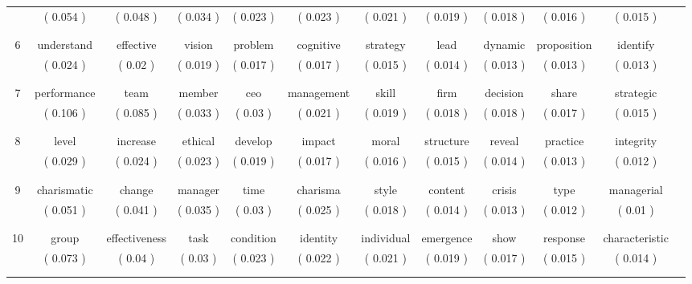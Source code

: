 \documentclass[english]{article}
\begin{document}
\begin{table}
{\begin{threeparttable}
\begin{tabular}{cccccccccccc}
            & ( 0.054 )        & ( 0.048 )     & ( 0.034 )  & ( 0.023 ) & ( 0.023 )  & ( 0.021 )  & ( 0.019 )   & ( 0.018 )   & ( 0.016 )   & ( 0.015 )      \\  \\ [-1.8ex] \\ [-1.8ex]
	6   & understand       & effective     & vision     & problem   & cognitive  & strategy   & lead        & dynamic     & proposition & identify       \\
            & ( 0.024 )        & ( 0.02 )      & ( 0.019 )  & ( 0.017 ) & ( 0.017 )  & ( 0.015 )  & ( 0.014 )   & ( 0.013 )   & ( 0.013 )   & ( 0.013 )      \\  \\ [-1.8ex] \\ [-1.8ex]
	7   & performance      & team          & member     & ceo       & management & skill      & firm        & decision    & share       & strategic      \\
            & ( 0.106 )        & ( 0.085 )     & ( 0.033 )  & ( 0.03 )  & ( 0.021 )  & ( 0.019 )  & ( 0.018 )   & ( 0.018 )   & ( 0.017 )   & ( 0.015 )      \\  \\ [-1.8ex] \\ [-1.8ex]
	8   & level            & increase      & ethical    & develop   & impact     & moral      & structure   & reveal      & practice    & integrity      \\
            & ( 0.029 )        & ( 0.024 )     & ( 0.023 )  & ( 0.019 ) & ( 0.017 )  & ( 0.016 )  & ( 0.015 )   & ( 0.014 )   & ( 0.013 )   & ( 0.012 )      \\  \\ [-1.8ex] \\ [-1.8ex]
	9   & charismatic      & change        & manager    & time      & charisma   & style      & content     & crisis      & type        & managerial     \\
            & ( 0.051 )        & ( 0.041 )     & ( 0.035 )  & ( 0.03 )  & ( 0.025 )  & ( 0.018 )  & ( 0.014 )   & ( 0.013 )   & ( 0.012 )   & ( 0.01 )       \\  \\ [-1.8ex] \\ [-1.8ex]
	10  & group            & effectiveness & task       & condition & identity   & individual & emergence   & show        & response    & characteristic \\
            & ( 0.073 )        & ( 0.04 )      & ( 0.03 )   & ( 0.023 ) & ( 0.022 )  & ( 0.021 )  & ( 0.019 )   & ( 0.017 )   & ( 0.015 )   & ( 0.014 )      \\  \\ [-1.8ex] \\ [-1.8ex]

\end{tabular}
\end{threeparttable}}
\end{table}
\end{document}
